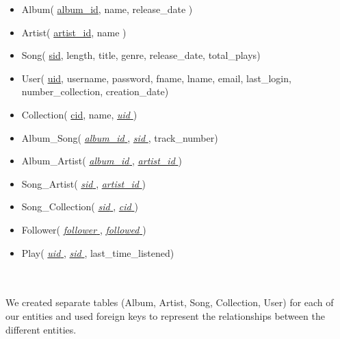 \documentclass[12pt]{article}
\begin{document}
    \begin{itemize}
        \item Album( \underline{album\_id}, name, release\_date )
        \item Artist( \underline{artist\_id}, name )
        \item Song( \underline{sid}, length, title, genre, release\_date, total\_plays)
        \item User( \underline{uid}, username, password, fname, lname, email, last\_login, number\_collection, creation\_date)
        \item Collection( \underline{cid}, name, \underline{ \emph{uid} } )
        \item Album\_Song( \underline{ \emph{album\_id} }, \underline{ \emph{sid} }, track\_number)
        \item Album\_Artist( \underline{ \emph{album\_id} }, \underline{ \emph{artist\_id} })
        \item Song\_Artist( \underline{ \emph{sid} }, \underline{ \emph{artist\_id} })
        \item Song\_Collection( \underline{ \emph{sid} }, \underline{ \emph{cid} } )
        \item Follower( \underline{ \emph{follower} }, \underline{ \emph{followed} } )
        \item Play( \underline{ \emph{uid} }, \underline{ \emph{sid} }, last\_time\_listened)
    \end{itemize}
    \\~\\
    We created separate tables (Album, Artist, Song, Collection, User) for each of our
    entities and used foreign keys to represent the relationships between the different entities.
\end{document}
